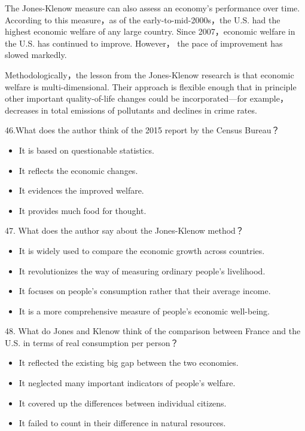\documentclass[UTF8,11pt]{ctexart}
\begin{document}
The Jones-Klenow measure can also assess an economy’s performance over time. According to this measure，as of the early-to-mid-2000s，the U.S. had the highest economic welfare of any large country. Since 2007，economic welfare in the U.S. has continued to improve. However， the pace of improvement has slowed markedly.


Methodologically，the lesson from the Jones-Klenow research is that economic welfare is multi-dimensional. Their approach is flexible enough that in principle other important quality-of-life changes could be incorporated—for example，decreases in total emissions of pollutants and declines in crime rates.


46.What does the author think of the 2015 report by the Census Bureau？


\begin{itemize}[leftmargin=2em,itemsep=.2em,topsep=.4em]\item[A.] It is based on questionable statistics.
\item[B.] It reflects the economic changes.
\item[C.] It evidences the improved welfare.
\item[D.] It provides much food for thought.
\end{itemize}

47. What does the author say about the Jones-Klenow method？


\begin{itemize}[leftmargin=2em,itemsep=.2em,topsep=.4em]\item[A.] It is widely used to compare the economic growth across countries.
\item[B.] It revolutionizes the way of measuring ordinary people’s livelihood.
\item[C.] It focuses on people’s consumption rather that their average income.
\item[D.] It is a more comprehensive measure of people’s economic well-being.
\end{itemize}

48. What do Jones and Klenow think of the comparison between France and the U.S. in terms of real consumption per person？


\begin{itemize}[leftmargin=2em,itemsep=.2em,topsep=.4em]\item[A.] It reflected the existing big gap between the two economies.
\item[B.] It neglected many important indicators of people’s welfare.
\item[C.] It covered up the differences between individual citizens.
\item[D.] It failed to count in their difference in natural resources.
\end{itemize}
\end{document}
